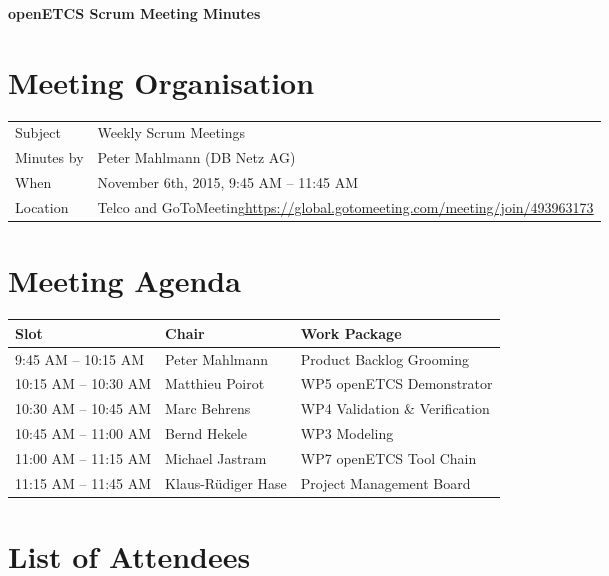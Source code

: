 \documentclass[a4paper, 11pt]{article}
\begin{document}
{\begin{center}\huge\bf openETCS Scrum Meeting Minutes\end{center}}

\section{Meeting Organisation}

\renewcommand{\arraystretch}{1.5}
\begin{supertabular}{m{.2\textwidth}m{.8\textwidth}}
Subject & Weekly Scrum Meetings\\
Minutes by & Peter Mahlmann (DB Netz AG)\\
When & November 6th, 2015, 9:45 AM -- 11:45 AM\\
Location & Telco and GoToMeeting\newline \url{https://global.gotomeeting.com/meeting/join/493963173}\\
\end{supertabular}

\renewcommand{\arraystretch}{1.0}
\section{Meeting Agenda}

\begin{tabular}{lll}
\toprule
\textbf{Slot} &  \textbf{Chair} & \textbf{Work Package} \\
\midrule 
9:45 AM -- 10:15 AM & Peter Mahlmann & Product Backlog Grooming  \\
10:15 AM -- 10:30 AM & Matthieu Poirot & WP5 openETCS Demonstrator \\  
10:30 AM -- 10:45 AM & Marc Behrens & WP4 Validation \& Verification \\
10:45 AM -- 11:00 AM & Bernd Hekele & WP3 Modeling \\
11:00 AM -- 11:15 AM & Michael Jastram & WP7 openETCS Tool Chain \\
11:15 AM -- 11:45 AM & Klaus-R\"udiger Hase & Project Management Board \\
\bottomrule
\end{tabular}

\section{List of Attendees}
\end{document}
